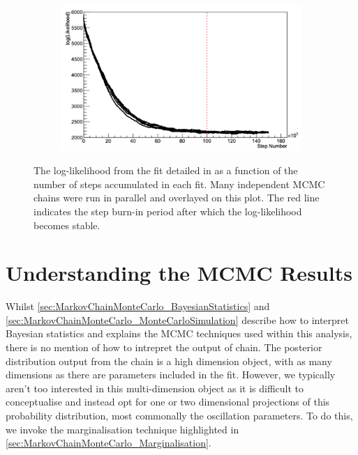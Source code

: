 \begin{figure}[h]
  \begin{subfigure}[t]{\textwidth}
    \includegraphics[width=\textwidth, trim={0mm 0mm 0mm 0mm}, clip,page=1]{Figures/MCMC/MCTechnique_LLHStep.pdf}
  \end{subfigure}
  \caption{The log-likelihood from the fit detailed in  as a function of the number of steps accumulated in each fit. Many independent MCMC chains were run in parallel and overlayed on this plot. The red line indicates the  step burn-in period after which the log-likelihood becomes stable.}
  \label{fig:MCMC_MCTechniqueLLHVsStep}
\end{figure}

\section{Understanding the MCMC Results}
\label{sec:MarkovChainMonteCarlo_UnderstandingMCMCResults}

Whilst \autoref{sec:MarkovChainMonteCarlo_BayesianStatistics} and \autoref{sec:MarkovChainMonteCarlo_MonteCarloSimulation} describe how to interpret Bayesian statistics and explains the MCMC techniques used within this analysis, there is no mention of how to intrepret the output of chain. The posterior distribution output from the chain is a high dimension object, with as many dimensions as there are parameters included in the fit. However, we typically aren't too interested in this multi-dimension object as it is difficult to conceptualise and instead opt for one or two dimensional projections of this probability distribution, most commonally the oscillation parameters. To do this, we invoke the marginalisation technique highlighted in \autoref{sec:MarkovChainMonteCarlo_Marginalisation}.

